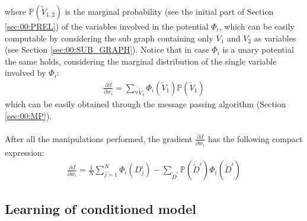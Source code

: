 where $\mathbb{P}(\tilde{V}_{1,2})$ is the marginal probability (see the initial part of Section \ref{sec:00:PREL}) of the variables involved in the potential $\Phi _i$, which can be easily computable by considering the sub graph containing only $V_1$ and $V_2$ as variables (see Section \ref{sec:00:SUB_GRAPH}). Notice that in case $\Phi _i$ is a unary potential the same holds, considering the marginal distribution of the single variable involved by $\Phi _i$:
\begin{eqnarray}
\frac{\partial \beta}{\partial w_i} =
 \sum _{ \forall \tilde{V}_{1} } \Phi _i(\tilde{V}_{1}) \mathbb{P}(\tilde{V}_{1})
\end{eqnarray}
which can be easily obtained through the message passing algorithm (Section \ref{sec:00:MP}).
\\
\\
After all the manipulations performed, the gradient $\frac{\partial J}{\partial  w_i}$ has the following compact expression:
\begin{eqnarray}
\frac{\partial J}{\partial  w_i} =
\frac{1}{N} \sum_{j=1}^{N} \Phi_i(D^i_j) - \sum_{\tilde{D}^i} \mathbb{P}(\tilde{D}^i)\Phi_i(\tilde{D}^i)
\label{eq:00:J_grad_unc}
\end{eqnarray} 

\subsection{Learning of conditioned model}
\label{sec:00:CON_LEARN}

